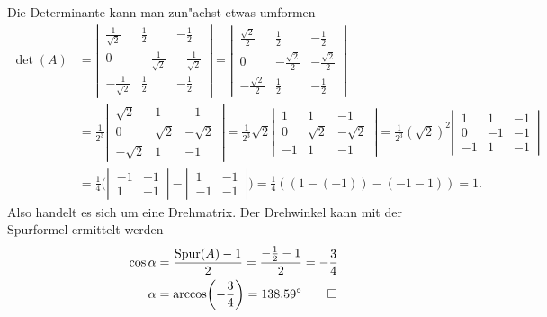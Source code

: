 \begin{loesung}
Die Determinante kann man zun"achst etwas umformen
\begin{align*}
\det(A)
&=
\left|\,\begin{matrix}
\frac1{\sqrt{2}}&\frac12&-\frac12\\
0&-\frac1{\sqrt{2}}&-\frac1{\sqrt{2}}\\
-\frac1{\sqrt{2}}&\frac12&-\frac12
\end{matrix}\,\right|
=
\left|\,\begin{matrix}
\frac{\sqrt{2}}2&\frac12&-\frac12\\
0&-\frac{\sqrt{2}}2&-\frac{\sqrt{2}}2\\
-\frac{\sqrt{2}}2&\frac12&-\frac12
\end{matrix}\,\right|
\\
&=
\frac1{2^3}
\left|\,\begin{matrix}
\sqrt{2}&1&-1\\
0&\sqrt{2}&-\sqrt{2}\\
-\sqrt{2}&1&-1
\end{matrix}\,\right|
=
\frac1{2^3}\sqrt{2}
\left|\,\begin{matrix}
1&1&-1\\
0&\sqrt{2}&-\sqrt{2}\\
-1&1&-1
\end{matrix}\,\right|
=
\frac1{2^3}(\sqrt{2})^2
\left|\,\begin{matrix}
1&1&-1\\
0&-1&-1\\
-1&1&-1
\end{matrix}\,\right|
\\
&=
\frac14\biggl(
\left|\,\begin{matrix}
-1&-1\\1&-1
\end{matrix}\,\right|
-
\left|\,\begin{matrix}
1&-1\\
-1&-1
\end{matrix}\,\right|
\biggr)=\frac14((1-(-1))-(-1-1))=1.
\end{align*}
Also handelt es sich um eine Drehmatrix. Der Drehwinkel kann mit der
Spurformel ermittelt werden
\begin{align*}
\cos\alpha&=\frac{\operatorname{Spur}(A)-1}2=\frac{-\frac12-1}2=-\frac34
\\
\alpha&=\arccos\biggl(-\frac34\biggr)=138.59^\circ
\qedhere
\end{align*}
\end{loesung}

